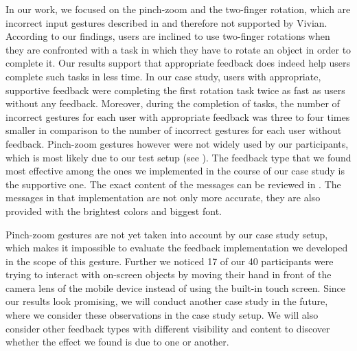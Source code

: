 \documentclass[manuscript]{acmart}
\begin{document}
		In our work, we focused on the pinch-zoom and the two-finger rotation, which are incorrect input gestures described in  and therefore not supported by Vivian. According to our findings, users are inclined to use two-finger rotations when they are confronted with a task in which they have to rotate an object in order to complete it. Our results support that appropriate feedback does indeed help users complete such tasks in less time. In our case study, users with appropriate, supportive feedback were completing the first rotation task twice as fast as users without any feedback. Moreover, during the completion of tasks, the number of incorrect gestures for each user with appropriate feedback was three to four times smaller in comparison to the number of incorrect gestures for each user without feedback. Pinch-zoom gestures however were not widely used by our participants, which is most likely due to our test setup (see ). The feedback type that we found most effective among the ones we implemented in the course of our case study is the supportive one. The exact content of the messages can be reviewed in . The messages in that implementation are not only more accurate, they are also provided with the brightest colors and biggest font.

		Pinch-zoom gestures are not yet taken into account by our case study setup, which makes it impossible to evaluate the feedback implementation we developed in the scope of this gesture. Further we noticed 17 of our 40 participants were trying to interact with on-screen objects by moving their hand in front of the camera lens of the mobile device instead of using the built-in touch screen. Since our results look promising, we will conduct another case study in the future, where we consider these observations in the case study setup. We will also consider other feedback types with different visibility and content to discover whether the effect we found is due to one or another.

	
	
\end{document}
